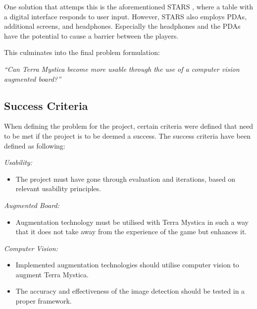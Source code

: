 One solution that attemps this is the aforementioned STARS \citep{magStars}, where a table with a digital interface responds to user input. However, STARS also employs PDAs, additional screens, and headphones. Especially the headphones and the PDAs have the potential to cause a barrier between the players.

This culminates into the final problem formulation:

\textit{“Can Terra Mystica become more usable through the use of a computer vision augmented board?”}

\subsection{Success Criteria}
When defining the problem for the project, certain criteria were defined that need to be met if the project is to be deemed a success. The success criteria have been defined as following:

\textit{Usability:}
\begin{itemize}
	\item The project must have gone through evaluation and iterations, based on relevant usability principles.
\end{itemize}
\textit{Augmented Board:}
\begin{itemize}
	\item Augmentation technology must be utilised with Terra Mystica in such a way that it does not take away from the experience of the game but enhances it.
\end{itemize}
\textit{Computer Vision:}
\begin{itemize}
	\item Implemented augmentation technologies should utilise computer vision to augment Terra Mystica.
	\item The accuracy and effectiveness of the image detection should be tested in a proper framework.
\end{itemize} 
